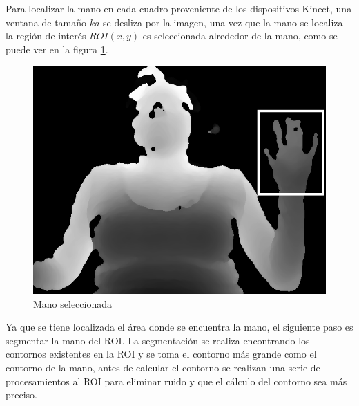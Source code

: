 Para localizar la mano en cada cuadro proveniente de los dispositivos  Kinect, una ventana de tamaño $ka$ se desliza por la imagen, una vez que la mano se localiza la región de interés $ROI(x,y)$ es seleccionada alrededor de la mano, como se puede ver en la figura \ref{fig:Roi}.

\begin{figure}[h!]
\begin{center}
\includegraphics[scale=.5]{./Figures/roi.png}
\end{center}
\caption{Mano seleccionada}
\label{fig:Roi}
\end{figure}  

Ya que se tiene localizada el área donde se encuentra la mano, el siguiente paso es segmentar la mano del ROI. La segmentación se realiza encontrando los contornos existentes en la ROI y se toma el contorno más grande como el contorno de la mano, antes de calcular el contorno se realizan una serie de procesamientos al ROI para eliminar ruido y que el cálculo del contorno sea más preciso.    

